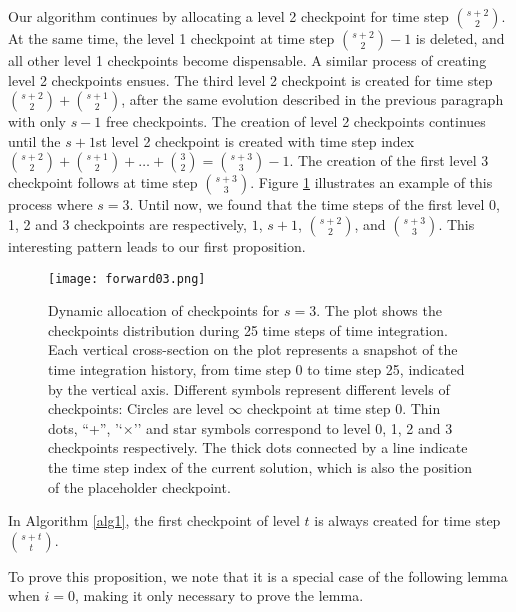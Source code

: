 \documentclass[oneeqnum, onethmnum, onefignum, onetabnum]{siamltex}
\begin{document}
Our algorithm continues by allocating a level 2 checkpoint for time step
$\binom{s + 2}{2}$.  At the same time, the level 1 checkpoint at time
step $\binom{s + 2}{2} - 1$ is deleted, and all other
level 1 checkpoints become dispensable.  A similar process of creating
level 2 checkpoints ensues.  The third level 2 checkpoint is
created for time step $\binom{s + 2}{2} + \binom{s + 1}{2}$, after
the same evolution described in the previous paragraph with only $s - 1$
free checkpoints.  The creation of level 2 checkpoints continues until the
$s + 1$st level 2 checkpoint is created with time step index
$\binom{s + 2}{2} + \binom{s + 1}{2} + \ldots + \binom{3}{2} = 
\binom{s + 3}{3} - 1$.  The creation of the  first level 3 checkpoint
follows at time step $\binom{s + 3}{3}$.  Figure \ref{fig0} illustrates
an example of this process where $s = 3$.
Until now, we found that the
time steps of the first level 0, 1, 2 and 3 checkpoints are respectively, $1$,
$s + 1$, $\binom{s + 2}{2}$, and $\binom{s + 3}{3}$.  This
interesting pattern leads to our first proposition.
\begin{figure}[ht!] \center
    \texttt{[image: forward03.png]}
    \caption{Dynamic allocation of checkpoints for $s = 3$.  The plot
    shows the checkpoints distribution during 25 time steps of time
    integration.  Each vertical cross-section on the plot represents a
    snapshot of the time integration history, from time step 0 to time step 25,
    indicated by the vertical axis.
    Different symbols represent different levels of
    checkpoints:  Circles are level $\infty$ checkpoint at time step 0.
    Thin dots, ``+'', '`$\times$'' and star symbols correspond to
    level 0, 1, 2 and 3 checkpoints respectively.
    The thick dots connected by a line indicate the
    time step index of the current solution, which is also the position of the
    placeholder checkpoint.}
\label{fig0} 
\end{figure}

\begin{proposition} \label{thm1}
    In Algorithm \ref{alg1}, the first checkpoint of level $t$ is always
    created for time step $\binom{s + t}{t}$.
\end{proposition}

To prove this proposition, we note that it is a special case of the following
lemma when $i = 0$, making it only necessary to prove the lemma.
\end{document}
